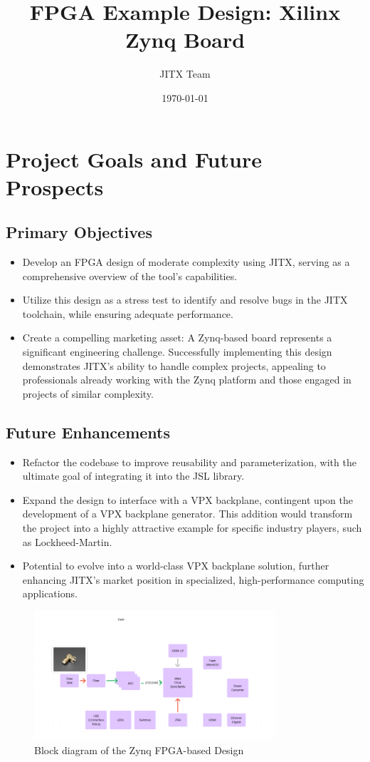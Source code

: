 \documentclass{article}
\title{FPGA Example Design: Xilinx Zynq Board}
\author{JITX Team}
\date{\today}
\begin{document}
\maketitle

\section{Project Goals and Future Prospects}

\subsection{Primary Objectives}
\begin{itemize}
    \item Develop an FPGA design of moderate complexity using JITX, serving as a comprehensive overview of the tool's capabilities.
    \item Utilize this design as a stress test to identify and resolve bugs in the JITX toolchain, while ensuring adequate performance.
    \item Create a compelling marketing asset: A Zynq-based board represents a significant engineering challenge. Successfully implementing this design demonstrates JITX's ability to handle complex projects, appealing to professionals already working with the Zynq platform and those engaged in projects of similar complexity.
\end{itemize}

\subsection{Future Enhancements}
\begin{itemize}
    \item Refactor the codebase to improve reusability and parameterization, with the ultimate goal of integrating it into the JSL library.
    \item Expand the design to interface with a VPX backplane, contingent upon the development of a VPX backplane generator. This addition would transform the project into a highly attractive example for specific industry players, such as Lockheed-Martin.
    \item Potential to evolve into a world-class VPX backplane solution, further enhancing JITX's market position in specialized, high-performance computing applications.
\end{itemize}

\begin{figure}[htbp]
    \centering
    \includegraphics[width=0.8\textwidth]{../pics/block-diagram.png}
    \caption{Block diagram of the Zynq FPGA-based Design}
    \label{fig:fpga-block-diagram}
\end{figure}
\end{document}

